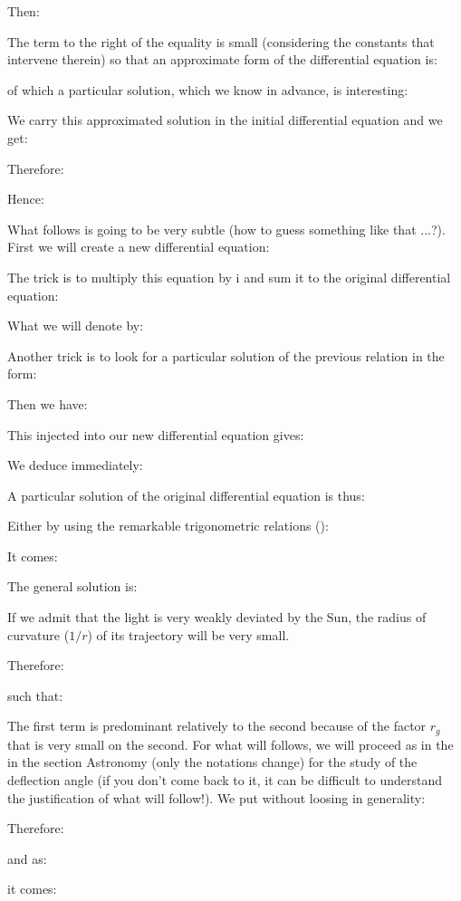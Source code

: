 	Then:
	
	The term to the right of the equality is small (considering the constants that intervene therein) so that an approximate form of the differential equation is:
	
	of which a particular solution, which we know in advance, is interesting:
	
	We carry this approximated solution in the initial differential equation and we get:
	
	Therefore:
	
	Hence:
	
	What follows is going to be very subtle (how to guess something like that ...?). First we will create a new differential equation:
	
	The trick is to multiply this equation by $\mathrm{i}$ and sum it to the original differential equation:
	
	What we will denote by:
	
	Another trick is to look for a particular solution of the previous relation in the form:
	
	Then we have:
	
	This injected into our new differential equation gives:
	
	We deduce immediately:
	
	A particular solution of the original differential equation is thus:
	
	Either by using the remarkable trigonometric relations ():
	
	It comes:
	
	The general solution is:
	
	If we admit that the light is very weakly deviated by the Sun, the radius of curvature ($1/r$) of its trajectory will be very small.

	Therefore:
	
	such that:
	
	The first term is predominant relatively to the second because of the factor $r_g$ that is very small on the second. For what will follows, we will proceed as in the in the section Astronomy (only the notations change) for the study of the deflection angle (if you don't come back to it, it can be difficult to understand the justification of what will follow!). We put without loosing in generality:
	
	Therefore:
	
	and as:
	
	it comes:
	
